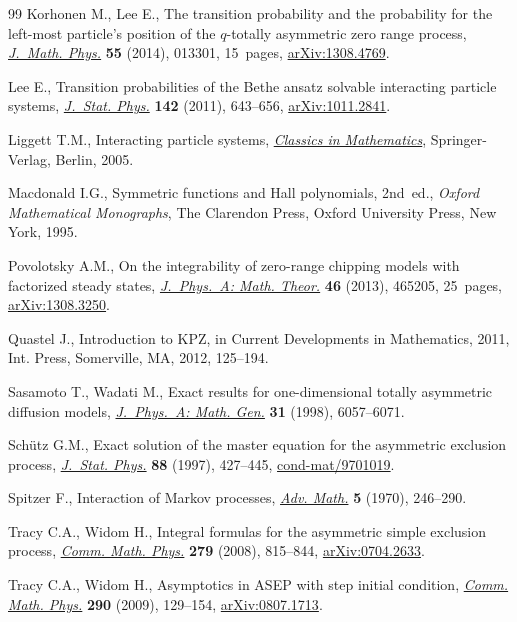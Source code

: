 \documentclass[pdftex]{sigma}
\numberwithin{equation}{section}
\begin{document}
\begin{thebibliography}{99}
Korhonen M., Lee E., The transition probability and the probability for the
 left-most particle's position of the {$q$}-totally asymmetric zero range
 process, \href{http://dx.doi.org/10.1063/1.4851758}{\textit{J.~Math. Phys.}} \textbf{55} (2014), 013301, 15~pages,
 \href{http://arxiv.org/abs/1308.4769}{arXiv:1308.4769}.

Lee E., Transition probabilities of the {B}ethe ansatz solvable interacting
 particle systems, \href{http://dx.doi.org/10.1007/s10955-011-0139-5}{\textit{J.~Stat. Phys.}} \textbf{142} (2011), 643--656,
 \href{http://arxiv.org/abs/1011.2841}{arXiv:1011.2841}.

Liggett T.M., Interacting particle systems, \href{http://dx.doi.org/10.1007/b138374}{\textit{Classics in Mathematics}},
 Springer-Verlag, Berlin, 2005.

Macdonald I.G., Symmetric functions and {H}all polynomials, 2nd~ed., \textit{Oxford
 Mathematical Monographs}, The Clarendon Press, Oxford University Press, New
 York, 1995.

Povolotsky A.M., On the integrability of zero-range chipping models with
 factorized steady states, \href{http://dx.doi.org/10.1088/1751-8113/46/46/465205}{\textit{J.~Phys.~A: Math. Theor.}} \textbf{46}
 (2013), 465205, 25~pages, \href{http://arxiv.org/abs/1308.3250}{arXiv:1308.3250}.

Quastel J., Introduction to {KPZ}, in Current Developments in Mathematics,
 2011, Int. Press, Somerville, MA, 2012, 125--194.

Sasamoto T., Wadati M., Exact results for one-dimensional totally asymmetric
 dif\/fusion models, \href{http://dx.doi.org/10.1088/0305-4470/31/28/019}{\textit{J.~Phys.~A: Math. Gen.}} \textbf{31} (1998),
 6057--6071.

Sch{\"u}tz G.M., Exact solution of the master equation for the asymmetric
 exclusion process, \href{http://dx.doi.org/10.1007/BF02508478}{\textit{J.~Stat. Phys.}} \textbf{88} (1997), 427--445,
 \href{http://arxiv.org/abs/cond-mat/9701019}{cond-mat/9701019}.

Spitzer F., Interaction of {M}arkov processes, \href{http://dx.doi.org/10.1016/0001-8708(70)90034-4}{\textit{Adv. Math.}} \textbf{5}
 (1970), 246--290.

Tracy C.A., Widom H., Integral formulas for the asymmetric simple exclusion
 process, \href{http://dx.doi.org/10.1007/s00220-008-0443-3}{\textit{Comm. Math. Phys.}} \textbf{279} (2008), 815--844,
 \href{http://arxiv.org/abs/0704.2633}{arXiv:0704.2633}.

Tracy C.A., Widom H., Asymptotics in {ASEP} with step initial condition,
 \href{http://dx.doi.org/10.1007/s00220-009-0761-0}{\textit{Comm. Math. Phys.}} \textbf{290} (2009), 129--154, \href{http://arxiv.org/abs/0807.1713}{arXiv:0807.1713}.

\end{thebibliography}\LastPageEnding
\end{document}
